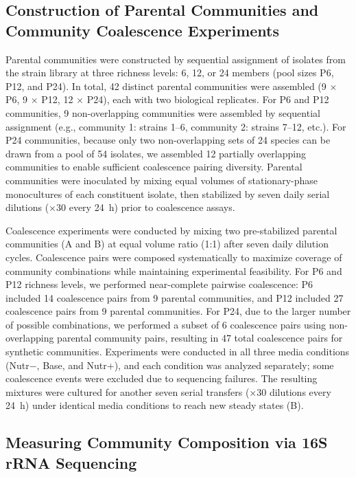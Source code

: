 \subsection*{Construction of Parental Communities and Community Coalescence Experiments}
\label{sec:methods:coalescence}

Parental communities were constructed by sequential assignment of isolates from the strain library at three richness levels: 6, 12, or 24 members (pool sizes P6, P12, and P24). In total, 42 distinct parental communities were assembled (9 $\times$ P6, 9 $\times$ P12, 12 $\times$ P24), each with two biological replicates. For P6 and P12 communities, 9 non-overlapping communities were assembled by sequential assignment (e.g., community 1: strains 1--6, community 2: strains 7--12, etc.). For P24 communities, because only two non-overlapping sets of 24 species can be drawn from a pool of 54 isolates, we assembled 12 partially overlapping communities to enable sufficient coalescence pairing diversity. Parental communities were inoculated by mixing equal volumes of stationary-phase monocultures of each constituent isolate, then stabilized by seven daily serial dilutions ($\times$30 every 24~h) prior to coalescence assays.

Coalescence experiments were conducted by mixing two pre-stabilized parental communities (A and B) at equal volume ratio (1:1) after seven daily dilution cycles. Coalescence pairs were composed systematically to maximize coverage of community combinations while maintaining experimental feasibility. For P6 and P12 richness levels, we performed near-complete pairwise coalescence: P6 included 14 coalescence pairs from 9 parental communities, and P12 included 27 coalescence pairs from 9 parental communities. For P24, due to the larger number of possible combinations, we performed a subset of 6 coalescence pairs using non-overlapping parental community pairs, resulting in 47 total coalescence pairs for synthetic communities. Experiments were conducted in all three media conditions (Nutr$-$, Base, and Nutr+), and each condition was analyzed separately; some coalescence events were excluded due to sequencing failures. The resulting mixtures were cultured for another seven serial transfers ($\times$30 dilutions every 24~h) under identical media conditions to reach new steady states (B).


\subsection*{Measuring Community Composition via 16S rRNA Sequencing}
\label{sec:methods:sequencing}

